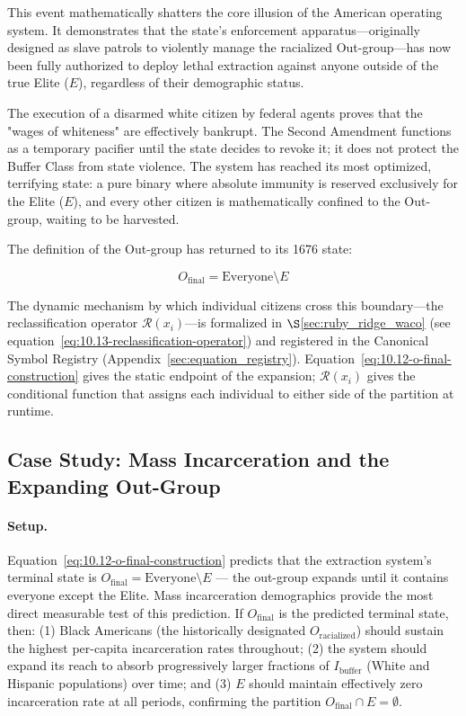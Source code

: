 This event mathematically shatters the core illusion of the American operating system. It demonstrates that the state's enforcement apparatus—originally designed as slave patrols to violently manage the racialized Out-group—has now been fully authorized to deploy lethal extraction against anyone outside of the true Elite ($E$), regardless of their demographic status.

The execution of a disarmed white citizen by federal agents proves that the "wages of whiteness" are effectively bankrupt. The Second Amendment functions as a temporary pacifier until the state decides to revoke it; it does not protect the Buffer Class from state violence. The system has reached its most optimized, terrifying state: a pure binary where absolute immunity is reserved exclusively for the Elite ($E$), and every other citizen is mathematically confined to the Out-group, waiting to be harvested.

The definition of the Out-group has returned to its 1676 state:

\begin{equation}\label{eq:10.12-o-final-construction}
O_{\text{final}} = \text{Everyone} \setminus E
\end{equation}

The dynamic mechanism by which individual citizens cross this boundary---the reclassification operator $\mathcal{R}(x_i)$---is formalized in $\S$\ref{sec:ruby_ridge_waco} (see equation~\eqref{eq:10.13-reclassification-operator}) and registered in the Canonical Symbol Registry (Appendix~\ref{sec:equation_registry}). Equation~\eqref{eq:10.12-o-final-construction} gives the static endpoint of the expansion; $\mathcal{R}(x_i)$ gives the conditional function that assigns each individual to either side of the partition at runtime.

\subsection*{Case Study: Mass Incarceration and the Expanding Out-Group}
\label{cs:mass_incarceration}

\paragraph{Setup.}
Equation~\ref{eq:10.12-o-final-construction} predicts that the extraction system's terminal state is $O_{\text{final}} = \text{Everyone} \setminus E$ --- the out-group expands until it contains everyone except the Elite. Mass incarceration demographics provide the most direct measurable test of this prediction. If $O_{\text{final}}$ is the predicted terminal state, then: (1) Black Americans (the historically designated $O_{\text{racialized}}$) should sustain the highest per-capita incarceration rates throughout; (2) the system should expand its reach to absorb progressively larger fractions of $I_{\text{buffer}}$ (White and Hispanic populations) over time; and (3) $E$ should maintain effectively zero incarceration rate at all periods, confirming the partition $O_{\text{final}} \cap E = \emptyset$.

